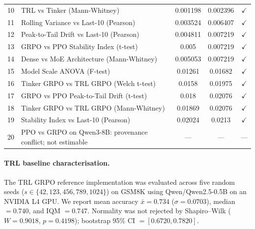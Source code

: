 \begin{table}[!ht]
\begin{tabular}{@{}rp{6.2cm}ccc@{}}
        10 & TRL vs Tinker (Mann-Whitney) & 0.001198 & 0.002396 & $\checkmark$ \\
        11 & Rolling Variance vs Last-10 (Pearson) & 0.003524 & 0.006407 & $\checkmark$ \\
        12 & Peak-to-Tail Drift vs Last-10 (Pearson) & 0.004811 & 0.007219 & $\checkmark$ \\
        13 & GRPO vs PPO Stability Index (t-test) & 0.005 & 0.007219 & $\checkmark$ \\
        14 & Dense vs MoE Architecture (Mann-Whitney) & 0.005053 & 0.007219 & $\checkmark$ \\
        15 & Model Scale ANOVA (F-test) & 0.01261 & 0.01682 & $\checkmark$ \\
        16 & Tinker GRPO vs TRL GRPO (Welch t-test) & 0.0158 & 0.01975 & $\checkmark$ \\
        17 & GRPO vs PPO Peak-to-Tail Drift (t-test) & 0.018 & 0.02076 & $\checkmark$ \\
        18 & Tinker GRPO vs TRL GRPO (Mann-Whitney) & 0.01869 & 0.02076 & $\checkmark$ \\
        19 & Stability Index vs Last-10 (Pearson) & 0.02024 & 0.0213 & $\checkmark$ \\
        20 & PPO vs GRPO on Qwen3-8B: provenance conflict; not estimable & --- & --- & --- \\
\bottomrule
\end{tabular}
\end{table}

\paragraph{TRL baseline characterisation.}
The TRL GRPO reference implementation was evaluated across five random seeds
($s \in \{42, 123, 456, 789, 1024\}$) on GSM8K using Qwen/Qwen2.5-0.5B on
an NVIDIA L4 GPU. We report mean accuracy $\bar{x} = 0.734$ ($\sigma = 0.0703$),
median $= 0.740$, and IQM $= 0.747$. Normality was not rejected by Shapiro--Wilk
($W = 0.9018$, $p = 0.4198$); bootstrap 95\% CI $= [0.6720, 0.7820]$.

